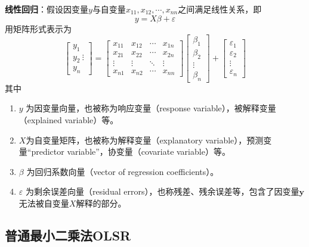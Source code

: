 \textbf{线性回归}：假设因变量$y$与自变量$x_{11},x_{12},\cdots,x_{nn}$之间满足线性关系，即
\begin{equation}
    y = X\beta + \varepsilon
\end{equation}
用矩阵形式表示为
\begin{equation}
    \begin{bmatrix}
        y_1    \\
        y_2 \
        \vdots \\
        y_n
    \end{bmatrix}
    =
    \begin{bmatrix}
        x_{11} & x_{12} & \cdots & x_{1n} \\
        x_{21} & x_{22} & \cdots & x_{2n} \\
        \vdots & \vdots & \ddots & \vdots \\
        x_{n1} & x_{n2} & \cdots & x_{nn}
    \end{bmatrix}
    \begin{bmatrix}
        \beta_1 \\
        \beta_2 \\
        \vdots  \\
        \beta_n
    \end{bmatrix}
    +
    \begin{bmatrix}
        \varepsilon_1 \\
        \varepsilon_2 \\
        \vdots        \\
        \varepsilon_n
    \end{bmatrix}
\end{equation}
其中
\begin{enumerate}[itemsep=0pt,parsep=0pt]
    \item $y$ 为因变量向量，也被称为响应变量（response variable），被解释变量（explained variable）等。
    \item $X$为自变量矩阵，也被称为解释变量（explanatory variable），预测变量“predictor variable”，协变量（covariate variable）等。
    \item $\beta$ 为回归系数向量（vector of regression coefficients）。
    \item $\varepsilon$ 为剩余误差向量（residual errors），也称残差、残余误差等，包含了因变量$\mathbf{y}$无法被自变量$X$解释的部分。
\end{enumerate}

\subsection{普通最小二乘法OLSR}

